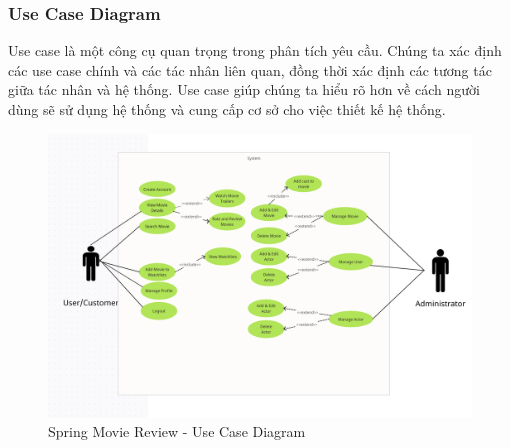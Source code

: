 \documentclass[12pt]{article}
\begin{document}
\subsubsection{Use Case Diagram}
Use case là một công cụ quan trọng trong phân tích yêu cầu. Chúng ta xác định các use case chính và các tác nhân liên quan, đồng thời xác định các tương tác giữa tác nhân và hệ thống. Use case giúp chúng ta hiểu rõ hơn về cách người dùng sẽ sử dụng hệ thống và cung cấp cơ sở cho việc thiết kế hệ thống.
\begin{figure}[H]
    \centering
    \includegraphics[scale=0.45]{Figs/Use_case.png}
    \caption{Spring Movie Review - Use Case Diagram}
\end{figure}
\end{document}
